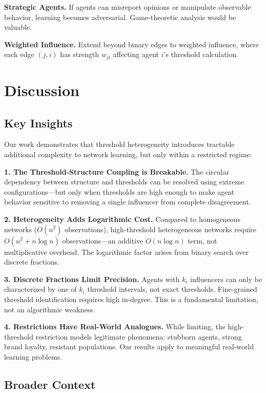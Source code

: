 \documentclass[conference]{IEEEtran}
\begin{document}
\textbf{Strategic Agents.} If agents can misreport opinions or manipulate observable behavior, learning becomes adversarial. Game-theoretic analysis would be valuable.

\textbf{Weighted Influence.} Extend beyond binary edges to weighted influence, where each edge $(j,i)$ has strength $w_{ji}$ affecting agent $i$'s threshold calculation.

\section{Discussion}
\label{sec:discussion}

\subsection{Key Insights}

Our work demonstrates that threshold heterogeneity introduces tractable additional complexity to network learning, but only within a restricted regime:

\textbf{1. The Threshold-Structure Coupling is Breakable.} The circular dependency between structure and thresholds can be resolved using extreme configurations—but only when thresholds are high enough to make agent behavior sensitive to removing a single influencer from complete disagreement.

\textbf{2. Heterogeneity Adds Logarithmic Cost.} Compared to homogeneous networks ($O(n^2)$ observations), high-threshold heterogeneous networks require $O(n^2 + n \log n)$ observations—an additive $O(n \log n)$ term, not multiplicative overhead. The logarithmic factor arises from binary search over discrete fractions.

\textbf{3. Discrete Fractions Limit Precision.} Agents with $k_i$ influencers can only be characterized by one of $k_i$ threshold intervals, not exact thresholds. Fine-grained threshold identification requires high in-degree. This is a fundamental limitation, not an algorithmic weakness.

\textbf{4. Restrictions Have Real-World Analogues.} While limiting, the high-threshold restriction models legitimate phenomena: stubborn agents, strong brand loyalty, resistant populations. Our results apply to meaningful real-world learning problems.

\subsection{Broader Context}
\end{document}
